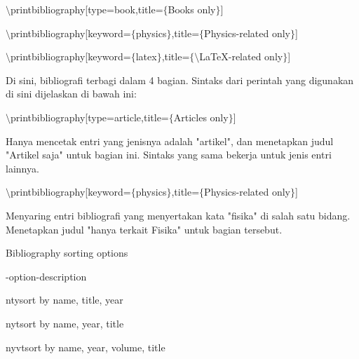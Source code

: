 \begin{itemize}
$\setminus$printbibliography[type=book,title=$ \{ $Books only$ \} $]\par

 \par

$\setminus$printbibliography[keyword=$ \{ $physics$ \} $,title=$ \{ $Physics-related only$ \} $]\par

$\setminus$printbibliography[keyword=$ \{ $latex$ \} $,title=$ \{ $$\setminus$LaTeX-related only$ \} $]\par

Di sini, bibliografi terbagi dalam 4 bagian. Sintaks dari perintah yang digunakan di sini dijelaskan di bawah ini:\par

$\setminus$printbibliography[type=article,title=$ \{ $Articles only$ \} $]\par

Hanya mencetak entri yang jenisnya adalah "artikel", dan menetapkan judul "Artikel saja" untuk bagian ini. Sintaks yang sama bekerja untuk jenis entri lainnya.\par

$\setminus$printbibliography[keyword=$ \{ $physics$ \} $,title=$ \{ $Physics-related only$ \} $]\par

Menyaring entri bibliografi yang menyertakan kata "fisika" di salah satu bidang. Menetapkan judul "hanya terkait Fisika" untuk bagian tersebut.\par

Bibliography sorting options\par

-option\hspace*{0.5in}\hspace*{0.5in}\hspace*{0.5in}-description\par

nty\hspace*{0.5in}\hspace*{0.5in}\hspace*{0.5in}sort by name, title, year\par

nyt\hspace*{0.5in}\hspace*{0.5in}\hspace*{0.5in}sort by name, year, title\par

nyvt\hspace*{0.5in}\hspace*{0.5in}\hspace*{0.5in}sort by name, year, volume, title\par


\end{itemize}
